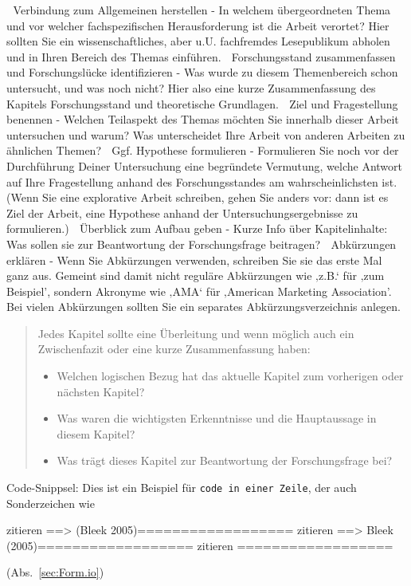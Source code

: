 	Verbindung zum Allgemeinen herstellen - In welchem übergeordneten Thema und vor welcher fachspezifischen Herausforderung ist die Arbeit verortet? Hier sollten Sie ein wissenschaftliches, aber u.U. fachfremdes Lesepublikum abholen und in Ihren Bereich des Themas einführen.
	Forschungsstand zusammenfassen und Forschungslücke identifizieren - Was wurde zu diesem Themenbereich schon untersucht, und was noch nicht? Hier also eine kurze Zusammenfassung des Kapitels Forschungsstand und theoretische Grundlagen. 
	Ziel und Fragestellung benennen - Welchen Teilaspekt des Themas möchten Sie innerhalb dieser Arbeit untersuchen und warum? Was unterscheidet Ihre Arbeit von anderen Arbeiten zu ähnlichen Themen? 
	Ggf. Hypothese formulieren - Formulieren Sie noch vor der Durchführung Deiner Untersuchung eine begründete Vermutung, welche Antwort auf Ihre Fragestellung anhand des Forschungsstandes am wahrscheinlichsten ist. (Wenn Sie eine explorative Arbeit schreiben, gehen Sie anders vor: dann ist es Ziel der Arbeit, eine Hypothese anhand der Untersuchungsergebnisse zu formulieren.) 
	Überblick zum Aufbau geben - Kurze Info über Kapitelinhalte: Was sollen sie zur Beantwortung der Forschungsfrage beitragen?
	Abkürzungen erklären - Wenn Sie Abkürzungen verwenden, schreiben Sie sie das erste Mal ganz aus. Gemeint sind damit nicht reguläre Abkürzungen wie ‚z.B.‘ für ‚zum Beispiel’, sondern Akronyme wie ‚AMA‘ für ‚American Marketing Association’. Bei vielen Abkürzungen sollten Sie ein separates Abkürzungsverzeichnis anlegen.


\begin{abstract}
Jedes Kapitel sollte eine Überleitung und wenn möglich auch ein Zwischenfazit oder eine kurze Zusammenfassung haben: 
\begin{itemize}
    \item Welchen logischen Bezug hat das aktuelle Kapitel zum vorherigen oder nächsten Kapitel?
    \item Was waren die wichtigsten Erkenntnisse und die Hauptaussage in diesem Kapitel?
    \item Was trägt dieses Kapitel zur Beantwortung der Forschungsfrage bei?
\end{itemize}
\end{abstract}


Code-Snippsel:
Dies ist ein Beispiel für \Verb|code in einer Zeile|, der auch Sonderzeichen wie

zitieren \citep{Bleek.2005} ==> (Bleek 2005)==================
zitieren \citet{Bleek.2005} ==> Bleek (2005)==================
zitieren \citep[S.~373]{Lange.2020} ==================


(Abs.~\ref{sec:Form.io})